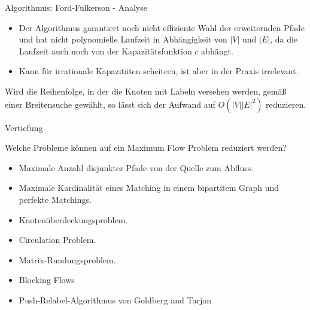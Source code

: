 \documentclass[aspectratio=169]{beamer}
\begin{document}
  \begin{frame}{Algorithmus: Ford-Fulkerson - Analyse}

  \begin{itemize}
    \item Der Algorithmus garantiert noch nicht effiziente Wahl der
    erweiternden Pfade und hat nicht polynomielle Laufzeit in Abhängigkeit von $|V|$ und $|E|$,
    da die Laufzeit auch noch von der Kapazitätsfunktion $c$ abhängt.
    \pause
    \item Kann für irrationale Kapazitäten scheitern, ist aber in der Praxis irrelevant.
  \end{itemize}

  \pause

  \begin{remark*}
    Wird die Reihenfolge, in der die Knoten mit Labeln versehen werden, gemäß
    einer Breitensuche gewählt, so lässt sich der Aufwand auf $O(|V||E|^2)$ reduzieren.
  \end{remark*}

  \end{frame}

  \begin{frame}{Vertiefung}

  \begin{anwendungen*}
    Welche Probleme können auf ein Maximum Flow Problem reduziert werden?
    \begin{itemize}
      \item Maximale Anzahl disjunkter Pfade von der Quelle zum Abfluss.
      \item Maximale Kardinalität eines Matching in einem bipartitem Graph und perfekte Matchings.
      \item Knotenüberdeckungsproblem.
      \item Circulation Problem.
      \item Matrix-Rundungsproblem.
    \end{itemize}

  \end{anwendungen*}

  \pause

  \begin{algorithmen*}
  \begin{itemize}
    \item Blocking Flows
    \item Push-Relabel-Algorithmus von Goldberg and Tarjan
  \end{itemize}

  \end{algorithmen*}



  \end{frame}
\end{document}
